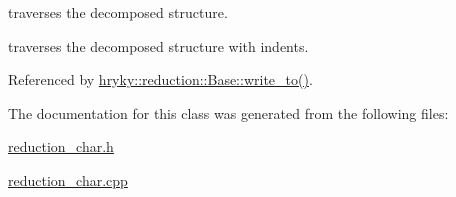 traverses the decomposed structure. 

traverses the decomposed structure with indents. 

Referenced by \hyperlink{classhryky_1_1reduction_1_1_base_a709cc7c48e1c90fe253739e46d82aa19}{hryky\-::reduction\-::\-Base\-::write\-\_\-to()}.



The documentation for this class was generated from the following files\-:\begin{DoxyCompactItemize}
\item 
\hyperlink{reduction__char_8h}{reduction\-\_\-char.\-h}\item 
\hyperlink{reduction__char_8cpp}{reduction\-\_\-char.\-cpp}\end{DoxyCompactItemize}
